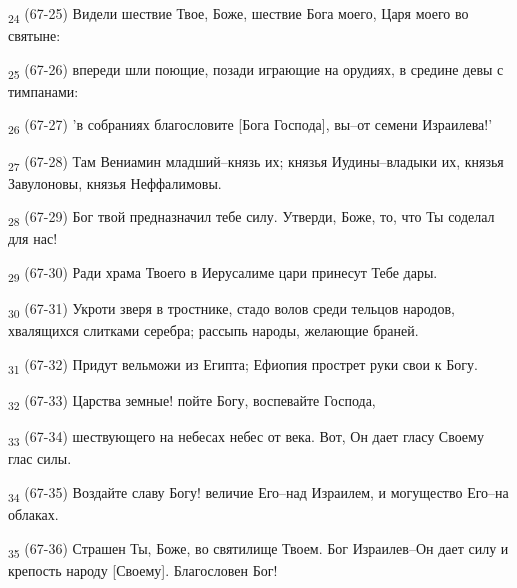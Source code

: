 \begin{tcolorbox}
\textsubscript{24} (67-25) Видели шествие Твое, Боже, шествие Бога моего, Царя моего во святыне:
\end{tcolorbox}
\begin{tcolorbox}
\textsubscript{25} (67-26) впереди шли поющие, позади играющие на орудиях, в средине девы с тимпанами:
\end{tcolorbox}
\begin{tcolorbox}
\textsubscript{26} (67-27) 'в собраниях благословите [Бога Господа], вы--от семени Израилева!'
\end{tcolorbox}
\begin{tcolorbox}
\textsubscript{27} (67-28) Там Вениамин младший--князь их; князья Иудины--владыки их, князья Завулоновы, князья Неффалимовы.
\end{tcolorbox}
\begin{tcolorbox}
\textsubscript{28} (67-29) Бог твой предназначил тебе силу. Утверди, Боже, то, что Ты соделал для нас!
\end{tcolorbox}
\begin{tcolorbox}
\textsubscript{29} (67-30) Ради храма Твоего в Иерусалиме цари принесут Тебе дары.
\end{tcolorbox}
\begin{tcolorbox}
\textsubscript{30} (67-31) Укроти зверя в тростнике, стадо волов среди тельцов народов, хвалящихся слитками серебра; рассыпь народы, желающие браней.
\end{tcolorbox}
\begin{tcolorbox}
\textsubscript{31} (67-32) Придут вельможи из Египта; Ефиопия прострет руки свои к Богу.
\end{tcolorbox}
\begin{tcolorbox}
\textsubscript{32} (67-33) Царства земные! пойте Богу, воспевайте Господа,
\end{tcolorbox}
\begin{tcolorbox}
\textsubscript{33} (67-34) шествующего на небесах небес от века. Вот, Он дает гласу Своему глас силы.
\end{tcolorbox}
\begin{tcolorbox}
\textsubscript{34} (67-35) Воздайте славу Богу! величие Его--над Израилем, и могущество Его--на облаках.
\end{tcolorbox}
\begin{tcolorbox}
\textsubscript{35} (67-36) Страшен Ты, Боже, во святилище Твоем. Бог Израилев--Он дает силу и крепость народу [Своему]. Благословен Бог!
\end{tcolorbox}
